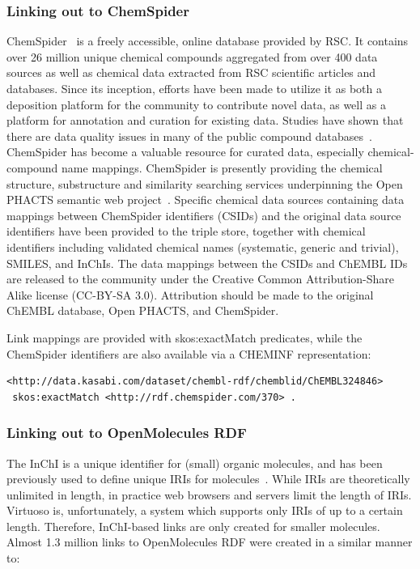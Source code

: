 \documentclass[10pt]{bmc_article}
\newenvironment{bmcformat}{\begin{raggedright}\baselineskip20pt\sloppy\setboolean{publ}{false}}{\end{raggedright}\baselineskip20pt\sloppy}
\begin{document}
\begin{bmcformat}
\subsubsection*{Linking out to ChemSpider}

ChemSpider~\cite{Pence2010} is a freely accessible, online database provided by RSC. It contains over 26 million unique
chemical compounds aggregated from over 400 data sources as well as chemical data extracted
from RSC scientific articles and databases. Since its inception, efforts have been made to
utilize it as both a deposition platform for the community to contribute novel data, as
well as a platform for annotation and curation for existing data. Studies have shown that there are data
quality issues in many of the public compound databases~\cite{Williams2011}. ChemSpider has become a
valuable resource for curated data, especially chemical-compound name mappings. ChemSpider
is presently providing the chemical structure, substructure and similarity searching services 
underpinning the Open PHACTS semantic web project~\cite{Williams2012}. Specific chemical data 
sources containing data mappings between ChemSpider identifiers (CSIDs) and the original data 
source identifiers have been provided to the triple store, together with chemical identifiers 
including validated chemical names (systematic, generic and trivial), SMILES, and InChIs. 
The data mappings between the CSIDs and ChEMBL IDs are released to the 
community under the Creative Common Attribution-Share Alike license (CC-BY-SA 3.0). Attribution 
should be made to the original ChEMBL database, Open PHACTS, and ChemSpider.

Link mappings are provided with skos:exactMatch predicates, while the ChemSpider identifiers
are also available via a CHEMINF representation:
 
\begin{small}
\begin{verbatim}
<http://data.kasabi.com/dataset/chembl-rdf/chemblid/ChEMBL324846>
 skos:exactMatch <http://rdf.chemspider.com/370> .
\end{verbatim}
\end{small}

\subsubsection*{Linking out to OpenMolecules RDF}

The InChI is a unique identifier for (small) organic molecules, and has been previously used
to define unique IRIs for molecules~\cite{Bradley2009,Willighagen2011}. While IRIs are theoretically unlimited in length,
in practice web browsers and servers limit the length of IRIs. Virtuoso is, unfortunately,
a system which supports only IRIs of up to a certain length. Therefore, InChI-based links are only created for smaller molecules. 
Almost 1.3 million links to OpenMolecules RDF were created in a similar manner to:


\end{bmcformat}
\end{document}
